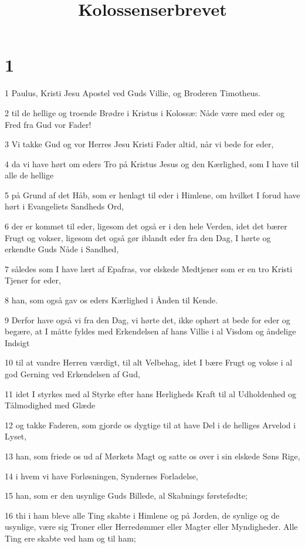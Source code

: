 

\title{Kolossenserbrevet}


\chapter{1}

\par 1 Paulus, Kristi Jesu Apostel ved Guds Villie, og Broderen Timotheus.
\par 2 til de hellige og troende Brødre i Kristus i Kolossæ: Nåde være med eder og Fred fra Gud vor Fader!
\par 3 Vi takke Gud og vor Herres Jesu Kristi Fader altid, når vi bede for eder,
\par 4 da vi have hørt om eders Tro på Kristus Jesus og den Kærlighed, som I have til alle de hellige
\par 5 på Grund af det Håb, som er henlagt til eder i Himlene, om hvilket I forud have hørt i Evangeliets Sandheds Ord,
\par 6 der er kommet til eder, ligesom det også er i den hele Verden, idet det bærer Frugt og vokser, ligesom det også gør iblandt eder fra den Dag, I hørte og erkendte Guds Nåde i Sandhed,
\par 7 således som I have lært af Epafras, vor elskede Medtjener som er en tro Kristi Tjener for eder,
\par 8 han, som også gav os eders Kærlighed i Ånden til Kende.
\par 9 Derfor have også vi fra den Dag, vi hørte det, ikke ophørt at bede for eder og begære, at I måtte fyldes med Erkendelsen af hans Villie i al Visdom og åndelige Indsigt
\par 10 til at vandre Herren værdigt, til alt Velbehag, idet I bære Frugt og vokse i al god Gerning ved Erkendelsen af Gud,
\par 11 idet I styrkes med al Styrke efter hans Herligheds Kraft til al Udholdenhed og Tålmodighed med Glæde
\par 12 og takke Faderen, som gjorde os dygtige til at have Del i de helliges Arvelod i Lyset,
\par 13 han, som friede os ud af Mørkets Magt og satte os over i sin elskede Søns Rige,
\par 14 i hvem vi have Forløsningen, Syndernes Forladelse,
\par 15 han, som er den usynlige Guds Billede, al Skabnings førstefødte;
\par 16 thi i ham bleve alle Ting skabte i Himlene og på Jorden, de synlige og de usynlige, være sig Troner eller Herredømmer eller Magter eller Myndigheder. Alle Ting ere skabte ved ham og til ham;
